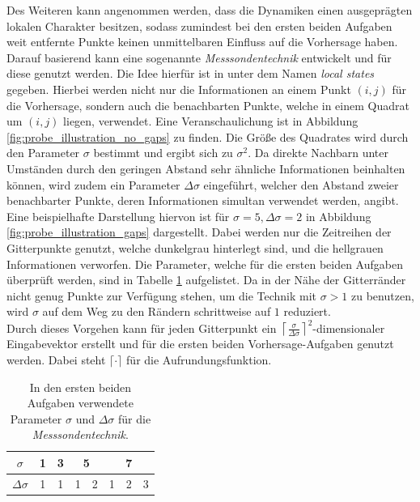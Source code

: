 Des Weiteren kann angenommen werden, dass die Dynamiken einen ausgeprägten lokalen Charakter besitzen, sodass zumindest bei den ersten beiden Aufgaben weit entfernte Punkte keinen unmittelbaren Einfluss auf die Vorhersage haben. Darauf basierend kann eine sogenannte \textit{Messsondentechnik} entwickelt und für diese genutzt werden. Die Idee hierfür ist in \citep{parlitz2000prediction} unter dem Namen \textit{local states} gegeben. Hierbei werden nicht nur die Informationen an einem Punkt $(i, j)$ für die Vorhersage, sondern auch die benachbarten Punkte, welche in einem Quadrat um $(i, j)$ liegen, verwendet. Eine Veranschaulichung ist in Abbildung \ref{fig:probe_illustration_no_gaps} zu finden. Die Größe des Quadrates wird durch den Parameter $\sigma$ bestimmt und ergibt sich zu $\sigma^2$. Da direkte Nachbarn unter Umständen durch den geringen Abstand sehr ähnliche Informationen beinhalten können, wird zudem ein Parameter $\Delta \sigma$ eingeführt, welcher den Abstand zweier benachbarter Punkte, deren Informationen simultan verwendet werden, angibt. Eine beispielhafte Darstellung hiervon ist für $\sigma = 5, \Delta \sigma=2$ in Abbildung \ref{fig:probe_illustration_gaps} dargestellt. Dabei werden nur die Zeitreihen der Gitterpunkte genutzt, welche dunkelgrau hinterlegt sind, und die hellgrauen Informationen verworfen. Die Parameter, welche für die ersten beiden Aufgaben überprüft werden, sind in Tabelle \ref{tab:probe_sigma_values} aufgelistet. Da in der Nähe der Gitterränder nicht genug Punkte zur Verfügung stehen, um die Technik mit $\sigma>1$ zu benutzen, wird $\sigma$ auf dem Weg zu den Rändern schrittweise auf $1$ reduziert.\\
Durch dieses Vorgehen kann für jeden Gitterpunkt ein ${\left \lceil{\frac{\sigma}{\Delta \sigma}}\right \rceil}^2$-dimensionaler Eingabevektor erstellt und für die ersten beiden Vorhersage-Aufgaben genutzt werden. Dabei steht $\lceil \cdot \rceil$ für die Aufrundungsfunktion.\\

\begin{table}[h]
\centering
\begin{tabular}{cc|c|c|c|c|c|c}
\hline
$\sigma$ & 1 & 3 & \multicolumn{2}{c|}{5} & \multicolumn{3}{c}{7} \\
\hline
$\Delta \sigma$ & 1 & 1 & 1 & 2 & 1 & 2 & 3 \\
\hline
\end{tabular} 
\caption{In den ersten beiden Aufgaben verwendete Parameter $\sigma$ und $\Delta \sigma$ für die \textit{Messsondentechnik}.}
\label{tab:probe_sigma_values}
\end{table} 

